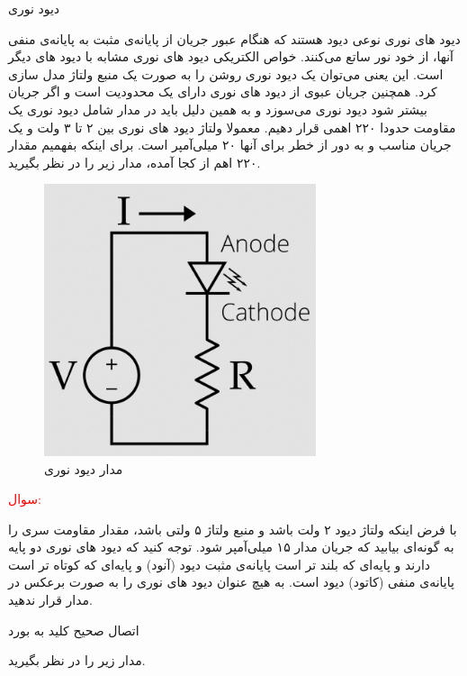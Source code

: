 \newline
\begin{nas}دیود نوری
\end{nas}
\newline
دیود های نوری نوعی دیود هستند که هنگام عبور جریان از پایانه‌ی مثبت به پایانه‌ی منفی آنها، از خود نور ساتع می‌کنند. خواص الکتریکی دیود های نوری مشابه با دیود های دیگر است. این یعنی می‌توان یک دیود نوری روشن را به صورت یک منبع ولتاژ مدل سازی کرد. همچنین جریان عبوی از دیود های نوری دارای یک محدودیت است و اگر جریان بیشتر شود دیود نوری می‌سوزد و به همین دلیل باید در مدار شامل دیود نوری یک مقاومت حدودا ۲۲۰ اهمی قرار دهیم. معمولا ولتاژ دیود های نوری بین ۲ تا ۳ ولت و یک جریان مناسب و به دور از خطر برای آنها ۲۰ میلی‌آمپر است. برای اینکه بفهمیم مقدار ۲۲۰ اهم از کجا آمده، مدار زیر را در نظر بگیرید.
\begin{figure}[h]
    \centering
    \includegraphics[width=8cm]{LED-Circuit.png}
    \caption{مدار دیود نوری}
    \label{fig:led-circ}
\end{figure}
\newline
\textcolor{red}{\begin{nas}سوال: \end{nas}}
با فرض اینکه ولتاژ دیود ۲ ولت باشد و منبع ولتاژ ۵ ولتی باشد، مقدار مقاومت سری را به گونه‌ای بیابید که جریان مدار ۱۵ میلی‌آمپر شود.
\newline
توجه کنید که دیود های نوری دو پایه دارند و پایه‌ای که بلند تر است پایانه‌ی مثبت دیود (آنود) و پایه‌ای که کوتاه تر است پایانه‌ی منفی (کاتود) دیود است. به هیچ عنوان دیود های نوری را به صورت برعکس در مدار قرار ندهید.
\pagebreak
\newline
\begin{nas}اتصال صحیح کلید به بورد\end{nas}
\newline
مدار زیر را در نظر بگیرید.
